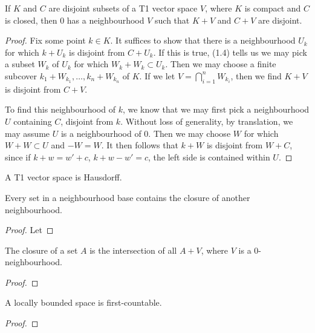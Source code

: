 \begin{prop}
    If $K$ and $C$ are disjoint subsets of a T1 vector space $V$, where $K$ is compact and $C$ is closed, then 0 has a neighbourhood $V$ such that $K + V$ and $C + V$ are disjoint.
\end{prop}
\begin{proof}
    Fix some point $k \in K$. It suffices to show that there is a neighbourhood $U_k$ for which $k + U_k$ is disjoint from $C + U_k$. If this is true, (1.4) tells us we may pick a subset $W_k$ of $U_k$ for which $W_k + W_k \subset U_k$. Then we may choose a finite subcover $k_1 + W_{k_1}, \dots, k_n + W_{k_n}$ of $K$. If we let $V = \bigcap_{i = 1}^n W_{k_i}$, then we find $K + V$ is disjoint from $C + V$.

    To find this neighbourhood of $k$, we know that we may first pick a neighbourhood $U$ containing $C$, disjoint from $k$. Without loss of generality, by translation, we may assume $U$ is a neighbourhood of 0. Then we may choose $W$ for which $W + W \subset U$ and $-W = W$. It then follows that $k + W$ is disjoint from $W + C$, since if $k + w = w' + c$, $k + w - w' = c$, the left side is contained within $U$.
\end{proof}

\begin{corollary}
    A T1 vector space is Hausdorff.
\end{corollary}

\begin{corollary}
    Every set in a neighbourhood base contains the closure of another neighbourhood.
\end{corollary}
\begin{proof}
    Let 
\end{proof}

\begin{corollary}
    The closure of a set $A$ is the intersection of all $A + V$, where $V$ is a 0-neighbourhood.
\end{corollary}
\begin{proof}

\end{proof}

\begin{prop}
    A locally bounded space is first-countable.
\end{prop}
\begin{proof}
    
\end{proof}

